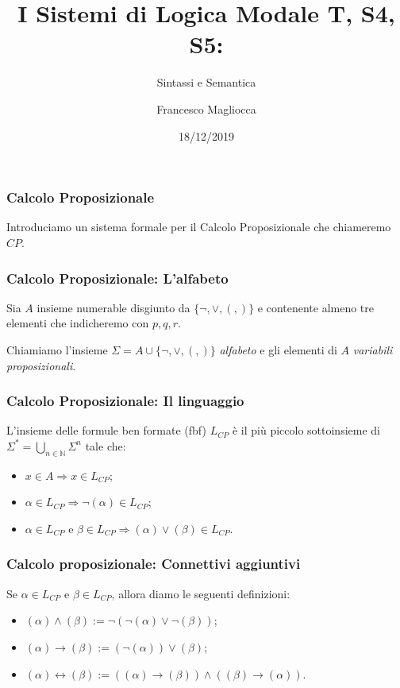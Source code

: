 \documentclass[notheorem]{beamer}
\title{I Sistemi di Logica Modale T, S4, S5:}
\subtitle{Sintassi e Semantica}
\author{Francesco Magliocca}
\date{18/12/2019}
\begin{document}
\frame{\titlepage}
\begin{frame}
\frametitle{Calcolo Proposizionale}
Introduciamo un sistema formale per il Calcolo Proposizionale
che chiameremo $CP$.
\end{frame}
\begin{frame}
\frametitle{Calcolo Proposizionale: L'alfabeto}
Sia $A$ insieme numerable disgiunto da $\{\neg, \lor, (, )\}$ e contenente
almeno tre elementi che indicheremo con $p, q, r$.

Chiamiamo l'insieme $\Sigma = A \cup \{\neg, \lor, (, )\}$ \emph{alfabeto}
e gli elementi di $A$ \emph{variabili proposizionali}.
\end{frame}
\begin{frame}
\frametitle{Calcolo Proposizionale: Il linguaggio}
L'insieme delle formule ben formate (fbf) $L_{CP}$ è il più piccolo sottoinsieme di
$\Sigma^{*} = \bigcup_{n \in \mathbb{N}} \Sigma^n$ tale che:
\begin{itemize}
\item $x \in A \Rightarrow x \in L_{CP}$;
\item $\alpha \in L_{CP} \Rightarrow \neg (\alpha) \in L_{CP}$;
\item $\alpha \in L_{CP}$ e $\beta \in L_{CP} \Rightarrow (\alpha) \lor (\beta) \in L_{CP}$.
\end{itemize}
\end{frame}
\begin{frame}
\frametitle{Calcolo proposizionale: Connettivi aggiuntivi}
Se $\alpha \in L_{CP}$ e $\beta \in L_{CP}$, allora diamo le seguenti definizioni:
\begin{itemize}
\item $(\alpha) \land (\beta) := \neg(\neg(\alpha) \lor \neg(\beta))$;
\item $(\alpha) \rightarrow (\beta) := (\neg(\alpha)) \lor (\beta)$;
\item $(\alpha) \leftrightarrow (\beta) := ((\alpha) \rightarrow (\beta)) \land ((\beta) \rightarrow (\alpha))$.
\end{itemize}
\end{frame}
\end{document}
